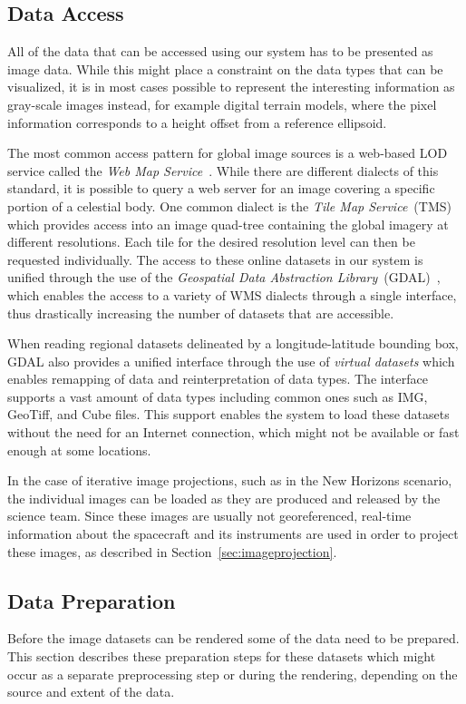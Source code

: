 \documentclass[journal]{vgtc}                %
\begin{document}
\subsection{Data Access} \label{sec:dataaccess}
All of the data that can be accessed using our system has to be presented as image data.
While this might place a constraint on the data types that can be visualized, it is in most cases possible to represent the interesting information as gray-scale images instead, for example digital terrain models, where the pixel information corresponds to a height offset from a reference ellipsoid.

The most common access pattern for global image sources is a web-based LOD service called the \emph{Web Map Service}~\cite{open2006opengis, maso2010opengis}.
While there are different dialects of this standard, it is possible to query a web server for an image covering a specific portion of a celestial body.
One common dialect is the \emph{Tile Map Service}~(TMS) which provides access into an image quad-tree containing the global imagery at different resolutions.
Each tile for the desired resolution level can then be requested individually.
The access to these online datasets in our system is unified through the use of the \emph{Geospatial Data Abstraction Library}~(GDAL)~\cite{warmerdam2008geospatial}, which enables the access to a variety of WMS dialects through a single interface, thus drastically increasing the number of datasets that are accessible.

When reading regional datasets delineated by a longitude-latitude bounding box, GDAL also provides a unified interface through the use of \emph{virtual datasets} which enables remapping of data and reinterpretation of data types.
The interface supports a vast amount of data types including common ones such as IMG, GeoTiff, and Cube files.
This support enables the system to load these datasets without the need for an Internet connection, which might not be available or fast enough at some locations.

In the case of iterative image projections, such as in the New Horizons scenario, the individual images can be loaded as they are produced and released by the science team.
Since these images are usually not georeferenced, real-time information about the spacecraft and its instruments are used in order to project these images, as described in Section~\ref{sec:imageprojection}.

\subsection{Data Preparation} \label{sec:processing}
Before the image datasets can be rendered some of the data need to be prepared.
This section describes these preparation steps for these datasets which might occur as a separate preprocessing step or during the rendering, depending on the source and extent of the data.
\end{document}

